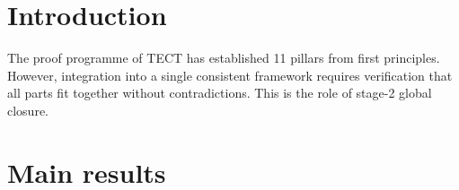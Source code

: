 \maketitle

\section{Introduction}
The proof programme of TECT has established 11 pillars from first principles. However,
integration into a single consistent framework requires verification that all parts fit together
without contradictions. This is the role of stage-2 global closure.

\section{Main results}

